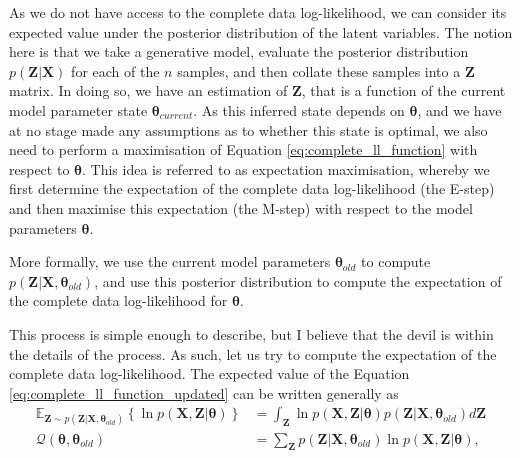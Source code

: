 \documentclass{article}
\begin{document}
As we do not have access to the complete data log-likelihood, we can consider its expected value under the posterior distribution of the latent variables. The notion here is that we take a generative model, evaluate the posterior distribution $p(\mathbf{Z}\vert\mathbf{X})$ for each of the $n$ samples, and then collate these samples into a $\mathbf{Z}$ matrix. In doing so, we have an estimation of $\mathbf{Z}$, that is a function of the current model parameter state $\boldsymbol\theta_{current}$. As this inferred state depends on $\boldsymbol\theta$, and we have at no stage made any assumptions as to whether this state is optimal, we also need to perform a maximisation of Equation \eqref{eq:complete_ll_function} with respect to $\boldsymbol\theta$. This idea is referred to as expectation maximisation, whereby we first determine the expectation of the complete data log-likelihood (the E-step) and then maximise this expectation (the M-step) with respect to the model parameters $\boldsymbol\theta$.

More formally, we use the current model parameters $\boldsymbol\theta_{old}$ to compute $p(\mathbf{Z}\vert\mathbf{X}, \boldsymbol\theta_{old})$, and use this posterior distribution to compute the expectation of the complete data log-likelihood for $\boldsymbol\theta$.


This process is simple enough to describe, but I believe that the devil is within the details of the process. As such, let us try to compute the expectation of the complete data log-likelihood. The expected value of the Equation \eqref{eq:complete_ll_function_updated} can be written generally as 
\begin{equation}
\begin{aligned}
\mathbb{E}_{\mathbf{Z} \sim p(\mathbf{Z}\vert\mathbf{X}, \boldsymbol\theta_{old})} \left\lbrace \ln p(\mathbf{X}, \mathbf{Z} \vert \boldsymbol\theta) \right\rbrace &= \int_{\mathbf{Z}} \ln p(\mathbf{X}, \mathbf{Z} \vert \boldsymbol\theta) p(\mathbf{Z} \vert\mathbf{X}, \boldsymbol\theta_{old}) d\mathbf{Z} \\
\mathcal{Q}(\boldsymbol\theta, \boldsymbol\theta_{old}) &= \sum_{\mathbf{Z}} p(\mathbf{Z}\vert\mathbf{X}, \boldsymbol\theta_{old}) \ln p(\mathbf{X}, \mathbf{Z} \vert \boldsymbol\theta),
\end{aligned}
\end{equation}
\end{document}
